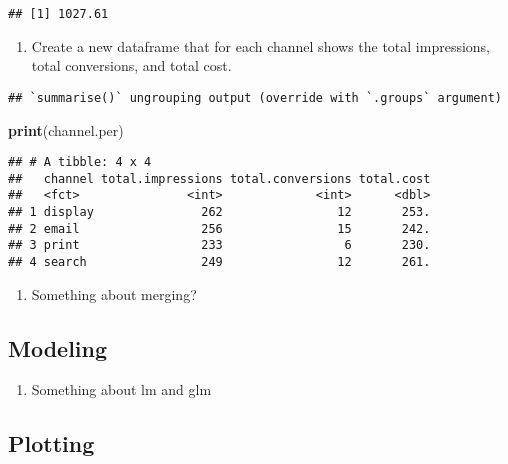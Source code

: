 \documentclass[
]{article}
\newenvironment{Shaded}{\begin{snugshade}}{\end{snugshade}}
\newcommand{\DataTypeTok}[1]{\textcolor[rgb]{0.13,0.29,0.53}{#1}}
\newcommand{\KeywordTok}[1]{\textcolor[rgb]{0.13,0.29,0.53}{\textbf{#1}}}
\newcommand{\NormalTok}[1]{#1}
\newcommand{\OperatorTok}[1]{\textcolor[rgb]{0.81,0.36,0.00}{\textbf{#1}}}
\newcommand{\StringTok}[1]{\textcolor[rgb]{0.31,0.60,0.02}{#1}}
\providecommand{\tightlist}{%
  \setlength{\itemsep}{0pt}\setlength{\parskip}{0pt}}
\begin{document}
\begin{verbatim}
## [1] 1027.61
\end{verbatim}

\begin{enumerate}
\def\labelenumi{\arabic{enumi}.}
\setcounter{enumi}{10}
\tightlist
\item
  Create a new dataframe that for each channel shows the total
  impressions, total conversions, and total cost.
\end{enumerate}

\begin{Shaded}
\end{Shaded}

\begin{verbatim}
## `summarise()` ungrouping output (override with `.groups` argument)
\end{verbatim}

\begin{Shaded}
\begin{Highlighting}[]
\KeywordTok{print}\NormalTok{(channel.per)}
\end{Highlighting}
\end{Shaded}

\begin{verbatim}
## # A tibble: 4 x 4
##   channel total.impressions total.conversions total.cost
##   <fct>               <int>             <int>      <dbl>
## 1 display               262                12       253.
## 2 email                 256                15       242.
## 3 print                 233                 6       230.
## 4 search                249                12       261.
\end{verbatim}

\begin{enumerate}
\def\labelenumi{\arabic{enumi}.}
\setcounter{enumi}{11}
\tightlist
\item
  Something about merging?
\end{enumerate}

\hypertarget{modeling}{%
\subsection{Modeling}\label{modeling}}

\begin{enumerate}
\def\labelenumi{\arabic{enumi}.}
\setcounter{enumi}{9}
\tightlist
\item
  Something about lm and glm
\end{enumerate}

\hypertarget{plotting}{%
\subsection{Plotting}\label{plotting}}
\end{document}
